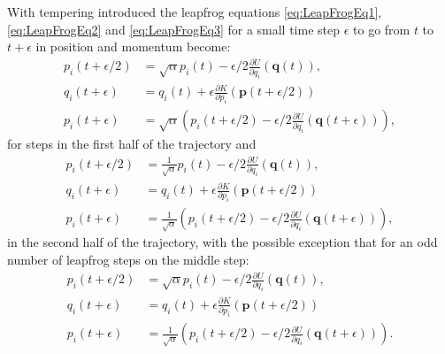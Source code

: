 \documentclass[12pt]{article}
\begin{document}
        With tempering introduced the leapfrog equations \ref{eq:LeapFrogEq1}, \ref{eq:LeapFrogEq2} and \ref{eq:LeapFrogEq3} for a small time step $\epsilon$ to go from $t$ to $t+\epsilon$ in position and momentum become:
        \begin{align}
            \label{eq:TLeapFrogEq1} p_i\left(t+\epsilon/2\right) & = \sqrt{\alpha}p_i\left(t\right) - \epsilon/2\frac{\partial U}{\partial q_i}\left(\bm{q}\left(t\right)\right), \\
            \label{eq:TLeapFrogEq2}q_i\left(t+\epsilon\right) & = q_i\left(t\right) + \epsilon\frac{\partial K}{\partial p_i}\left(\bm{p}\left(t+\epsilon/2\right)\right) \\
            \label{eq:TLeapFrogEq3}p_i\left(t+\epsilon\right) & = \sqrt{\alpha}\left(p_i\left(t+\epsilon/2\right) - \epsilon/2\frac{\partial U}{\partial q_i}\left(\bm{q}\left(t+\epsilon\right)\right)\right),
        \end{align}
        for steps in the first half of the trajectory and 
        \begin{align}
            p_i\left(t+\epsilon/2\right) & = \frac{1}{\sqrt{\alpha}}p_i\left(t\right) - \epsilon/2\frac{\partial U}{\partial q_i}\left(\bm{q}\left(t\right)\right), \\
            q_i\left(t+\epsilon\right) & = q_i\left(t\right) + \epsilon\frac{\partial K}{\partial p_i}\left(\bm{p}\left(t+\epsilon/2\right)\right) \\
            p_i\left(t+\epsilon\right) & = \frac{1}{\sqrt{\alpha}}\left(p_i\left(t+\epsilon/2\right) - \epsilon/2\frac{\partial U}{\partial q_i}\left(\bm{q}\left(t+\epsilon\right)\right)\right),
        \end{align}
        in the second half of the trajectory, with the possible exception that for an odd number of leapfrog steps on the middle step:
        \begin{align}
             p_i\left(t+\epsilon/2\right) & = \sqrt{\alpha}p_i\left(t\right) - \epsilon/2\frac{\partial U}{\partial q_i}\left(\bm{q}\left(t\right)\right), \\
            q_i\left(t+\epsilon\right) & = q_i\left(t\right) + \epsilon\frac{\partial K}{\partial p_i}\left(\bm{p}\left(t+\epsilon/2\right)\right) \\
            p_i\left(t+\epsilon\right) & = \frac{1}{\sqrt{\alpha}}\left(p_i\left(t+\epsilon/2\right) - \epsilon/2\frac{\partial U}{\partial q_i}\left(\bm{q}\left(t+\epsilon\right)\right)\right).
        \end{align}
\end{document}

